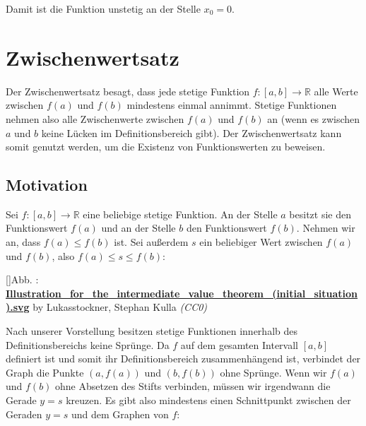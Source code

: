 \documentclass[fontsize=9pt,
               parskip=half-,
               DIV=14,
               listof=chapterentry,
               tocflat]{scrbook}
\newcounter{imagelabel}
\begin{document}
\begin{proof*}
Damit ist die Funktion unstetig an der Stelle $x_{0}=0$.

\end{proof*}

\chapter{Zwischenwertsatz}

Der Zwischenwertsatz besagt, dass jede stetige Funktion $f:[a,b]\to \mathbb {R} $ alle Werte zwischen $f(a)$ und $f(b)$ mindestens einmal annimmt. Stetige Funktionen nehmen also alle Zwischenwerte zwischen $f(a)$ und $f(b)$ an (wenn es zwischen $a$ und $b$ keine Lücken im Definitionsbereich gibt). Der Zwischenwertsatz kann somit genutzt werden, um die Existenz von Funktionswerten zu beweisen.

\section{Motivation}

Sei $f:[a,b]\to \mathbb {R} $ eine beliebige stetige Funktion. An der Stelle $a$ besitzt sie den Funktionswert $f(a)$ und an der Stelle $b$ den Funktionswert $f(b)$. Nehmen wir an, dass $f(a)\leq f(b)$ ist. Sei außerdem $s$ ein beliebiger Wert zwischen $f(a)$ und $f(b)$, also $f(a)\leq s\leq f(b)$:

[]{Abb. : \protect\href{https://commons.wikimedia.org/wiki/File:Illustration_for_the_intermediate_value_theorem_(initial_situation).svg}{\textbf{Illustration\allowbreak\_for\allowbreak\_the\allowbreak\_intermediate\allowbreak\_value\allowbreak\_theorem\allowbreak\_(initial\allowbreak\_situation).svg}} by Lukasstockner, Stephan Kulla \textit{(CC0)}}\begin{center}
\end{center}

Nach unserer Vorstellung besitzen stetige Funktionen innerhalb des Definitionsbereichs keine Sprünge. Da $f$ auf dem gesamten Intervall $[a,b]$ definiert ist und somit ihr Definitionsbereich zusammenhängend ist, verbindet der Graph die Punkte $(a,f(a))$ und $(b,f(b))$ ohne Sprünge. Wenn wir $f(a)$ und $f(b)$ ohne Absetzen des Stifts verbinden, müssen wir irgendwann die Gerade $y=s$ kreuzen. Es gibt also mindestens einen Schnittpunkt zwischen der Geraden $y=s$ und dem Graphen von $f$:
\end{document}
